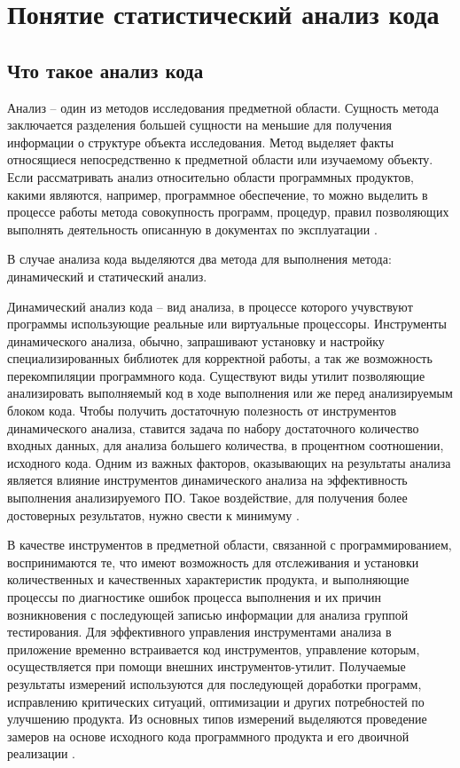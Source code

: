 \chapter{Понятие статистический анализ кода}

 \section{Что такое анализ кода}

Анализ -- один из методов исследования предметной области. Сущность метода заключается разделения большей сущности на меньшие для получения информации о структуре объекта исследования. Метод выделяет факты относящиеся непосредственно к предметной области или изучаемому объекту. Если рассматривать анализ относительно области программных продуктов, какими являются, например, программное обеспечение, то можно выделить в процессе работы метода совокупность программ, процедур, правил позволяющих выполнять деятельность описанную в документах по эксплуатации \cite{6}.

В случае анализа кода выделяются два метода для выполнения метода: динамический и статический анализ. 
 
Динамический анализ кода -- вид анализа, в процессе которого учувствуют программы использующие реальные или виртуальные процессоры. Инструменты динамического анализа, обычно, запрашивают установку и настройку специализированных библиотек для корректной работы, а так же возможность перекомпиляции программного кода. Существуют виды утилит позволяющие анализировать выполняемый код в ходе выполнения или же перед анализируемым блоком кода. Чтобы получить достаточную полезность от инструментов динамического анализа, ставится задача по набору достаточного количество входных данных, для анализа большего количества, в процентном соотношении, исходного кода. Одним из важных факторов, оказывающих на результаты анализа является влияние инструментов динамического анализа на эффективность выполнения анализируемого ПО. Такое воздействие, для получения более достоверных результатов, нужно свести к минимуму \cite{1}. 

В качестве инструментов в предметной области, связанной с программированием, воспринимаются те, что имеют возможность для отслеживания и установки количественных и качественных характеристик продукта, и выполняющие процессы по диагностике ошибок процесса выполнения и их причин возникновения с последующей записью информации для анализа группой тестирования. Для эффективного управления инструментами анализа в приложение временно встраивается код инструментов, управление которым, осуществляется при помощи внешних инструментов-утилит. Получаемые результаты измерений используются для последующей доработки программ, исправлению критических ситуаций, оптимизации и других потребностей по улучшению продукта. Из основных типов измерений выделяются проведение замеров на основе исходного кода программного продукта и его двоичной реализации \cite{2,3}. 

